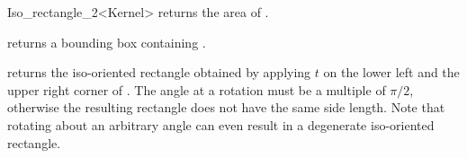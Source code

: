 \begin{ccRefClass} {Iso_rectangle_2<Kernel>}
       {returns the area of \ccVar. }

       {returns a bounding box containing \ccVar. }

       {returns the iso-oriented rectangle obtained by applying $t$ on 
        the lower left and the upper right corner of \ccVar.
        \ccPrecond The angle at a rotation must be a multiple of $\pi/2$,
        otherwise the resulting rectangle does not have the same side length.
        Note that rotating about an arbitrary angle can even result in
        a degenerate  iso-oriented rectangle.}



\ccSeeAlso
{}

\end{ccRefClass} 
